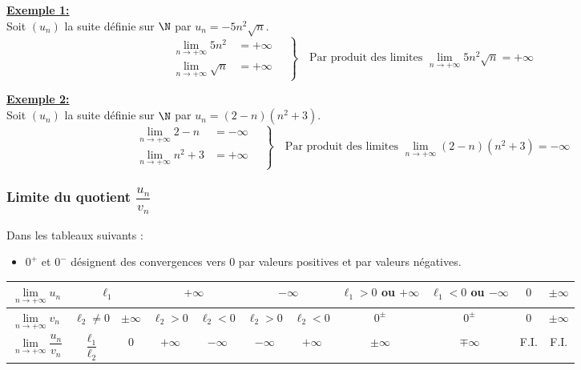 \documentclass[11pt,twoside, openany]{extbook}
\begin{document}
\textbf{\ul{Exemple 1:}}\\
Soit $(u_n)$ la suite définie sur $\N$ par $u_n=-5n^2 \sqrt{n}$. 
\begin{equation*}
	\left.
	\begin{aligned}
		\lim\limits_{n \rightarrow +\infty} 5n^2 &= +\infty \quad \\
		\lim\limits_{n \rightarrow +\infty}  \sqrt{n} &= +\infty 
	\end{aligned}
	\right\}
	\quad \text{Par produit des limites $\lim\limits_{n \rightarrow +\infty} 5n^2 \sqrt{n}=+\infty$}
\end{equation*}

\noindent \textbf{\ul{Exemple 2:}}\\
Soit $(u_n)$ la suite définie sur $\N$ par $u_n=(2-n)(n^2+3)$. 
\begin{equation*}
	\left.
	\begin{aligned}
		\lim\limits_{n \rightarrow +\infty} 2-n &= -\infty \quad \\
		\lim\limits_{n \rightarrow +\infty} n^2+3 &= +\infty 
	\end{aligned}
	\right\}
	\quad \text{Par produit des limites $\lim\limits_{n \rightarrow +\infty} (2-n)(n^2+3)=-\infty$}
\end{equation*}
\subsubsection{Limite du quotient $\dfrac{u_n}{v_n}$}
Dans les tableaux suivants :
\begin{itemize}
\item $0^+$ et $0^-$ désignent des convergences vers 0 par valeurs positives et  par valeurs négatives.
\end{itemize}

{\renewcommand{\arraystretch}{1.5} %
{\setlength{\tabcolsep}{0.15cm} %
\begin{tabular}{|l||*{8}{c|}*{2}{>{\columncolor[RGB]{211, 211, 211}}c|}}
\hline
$\lim\limits_{n \rightarrow +\infty} u_n$ & \multicolumn{2}{c|}{$\ell_1$} & \multicolumn{2}{c|}{$+\infty$} & \multicolumn{2}{c|}{$-\infty$}  & $\ell_1>0$ ou $+\infty$ & $\ell_1<0$ ou $-\infty$ & $0$& $\pm\infty$\\
\hline
$\lim\limits_{n \rightarrow +\infty} v_n$ & $\ell_2\neq 0$ & $\pm\infty$ & $\ell_2>0$ & $\ell_2<0$ & $\ell_2>0$ & $\ell_2<0$  & $0^\pm$ & $0^\pm$ & 0 & $\pm\infty$\\
\hline
\hline
$\lim\limits_{n \rightarrow +\infty} \dfrac{u_n}{v_n}$ & $\dfrac{\ell_1}{\ell_2}$ & $0$ & $+\infty$ & $-\infty$ & $-\infty$ & $+\infty$  & $\pm\infty$ & $\mp\infty$ & F.I.& F.I. \\
\hline
\end{tabular}}}\\
\end{document}
